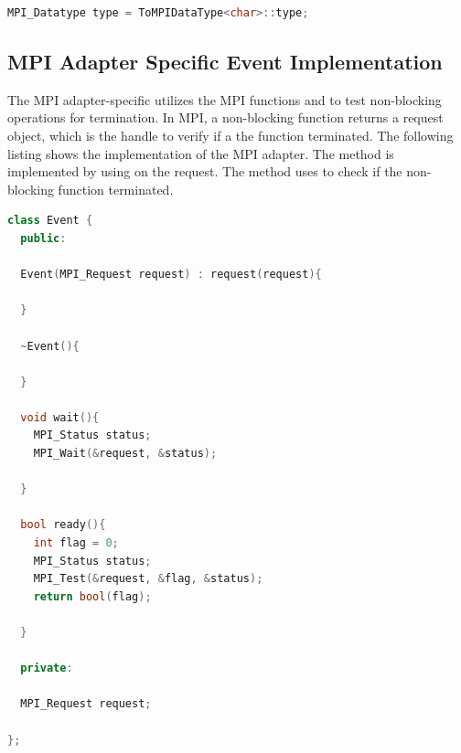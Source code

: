 \begin{minipage}[t]{\textwidth} 
\begin{lstlisting}[language=C++, label=lst:mpi_trait3]
  MPI_Datatype type = ToMPIDataType<char>::type;
\end{lstlisting}
\end{minipage}

\subsection{MPI Adapter Specific Event Implementation}
The MPI adapter-specific  utilizes the MPI functions
 and  to test non-blocking operations
for termination. In MPI, a non-blocking function returns a request
object, which is the handle to verify if a the function
terminated. The following listing shows the  implementation
of the MPI adapter.  The  method is implemented by using
 on the request. The  method uses
 to check if the non-blocking function terminated.

\begin{minipage}[t]{\textwidth} 
  \begin{lstlisting}[language=C++, label=lst:mpi_event, caption={MPI adapter-specific \cpp{Event} implementation. Non-blocking MPI operations can be handled by an \cpp{MPI\_Request} object. The \cpp{wait()} method waits until the communication operation terminated
    with \cpp{MPI\_Wait}. The \cpp{ready()} method checks if the communication operation terminated with \cpp{MPI\_Test}.}]
class Event {
  public:

  Event(MPI_Request request) : request(request){
    
  }
  
  ~Event(){
    
  }

  void wait(){
    MPI_Status status;
    MPI_Wait(&request, &status);
    
  }

  bool ready(){
    int flag = 0;
    MPI_Status status;
    MPI_Test(&request, &flag, &status);
    return bool(flag);
    
  }
  
  private:
  
  MPI_Request request;
  
};  
\end{lstlisting}
\end{minipage}

